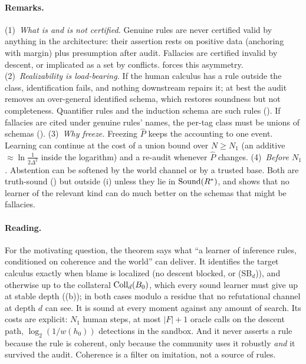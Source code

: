 \paragraph{Remarks.} (1)~\emph{What is and is not certified.} Genuine rules are never certified valid by anything in the architecture: their assertion rests on positive data (anchoring with margin) plus presumption after audit. Fallacies are certified invalid by descent, or implicated as a set by conflicts.  forces this asymmetry. (2)~\emph{Realizability is load-bearing.} If the human calculus has a rule outside the class, identification fails, and nothing downstream repairs it; at best the audit removes an over-general identified schema, which restores soundness but not completeness. Quantifier rules and the induction schema are such rules (). If fallacies are cited under genuine rules' names, the per-tag class must be unions of schemas (). (3)~\emph{Why freeze.} Freezing $\hat P$ keeps the accounting to one event. Learning can continue at the cost of a union bound over $N\ge N_1$ (an additive $\approx\ln\frac1{2\Delta^2}$ inside the logarithm) and a re-audit whenever $\hat P$ changes. (4)~\emph{Before $N_1$.} Abstention can be softened by the world channel or by a trusted base. Both are truth-sound () but outside (i) unless they lie in $\mathrm{Sound}(R^{*})$, and  shows that no learner of the relevant kind can do much better on the schemas that might be fallacies.

\paragraph{Reading.} For the motivating question, the theorem says what ``a learner of inference rules, conditioned on coherence and the world'' can deliver. It identifies the target calculus exactly when blame is localized (no descent blocked, or (SB$_d$)), and otherwise up to the collateral $\mathrm{Coll}_d(B_0)$, which every sound learner must give up at stable depth ((b)); in both cases modulo a residue that no refutational channel at depth $d$ can see. It is sound at every moment against any amount of search. Its costs are explicit: $N_1$ human steps, at most $|F|+1$ oracle calls on the descent path, $\log_2(1/w(h_0))$ detections in the sandbox. And it never asserts a rule because the rule is coherent, only because the community uses it robustly \emph{and} it survived the audit. Coherence is a filter on imitation, not a source of rules.

